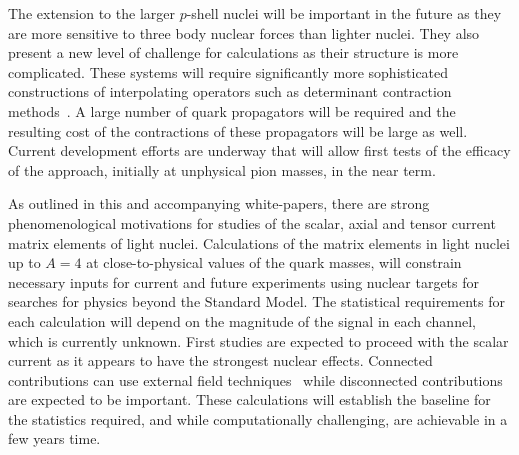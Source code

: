 The extension to the larger $p$-shell nuclei will be important in the future as they are more sensitive to three body nuclear forces than lighter nuclei. They also present a new level of challenge for calculations as their structure is more complicated. These systems will require significantly more sophisticated constructions of interpolating operators such as determinant contraction methods~\cite{Detmold:2012eu,Vachaspati:2014bda}. A large number of quark propagators will be required and the resulting cost of the contractions of these propagators will be large as well. Current development efforts are underway that will allow  first tests of the efficacy of the approach, initially at unphysical pion masses, in the near term.


As outlined in this and accompanying white-papers, there are strong phenomenological motivations for studies of the scalar, axial and tensor current matrix elements of light nuclei. Calculations of the matrix elements in light nuclei up to $A=4$ \cite{Winter:2017bfs} at close-to-physical values of the quark masses, will constrain necessary inputs for current and future experiments using nuclear targets for searches for physics beyond the Standard Model. The statistical requirements for each calculation will depend on the magnitude of the signal in each channel, which is currently unknown. First studies are expected to proceed with the scalar current as it appears to have the strongest nuclear effects. Connected contributions can use external field techniques~\cite{Savage:2016kon,Shanahan:2017bgi,Tiburzi:2017iux} while disconnected contributions are expected to be important. These calculations will establish the baseline for the statistics required, and while computationally challenging, are achievable in a few years time.



